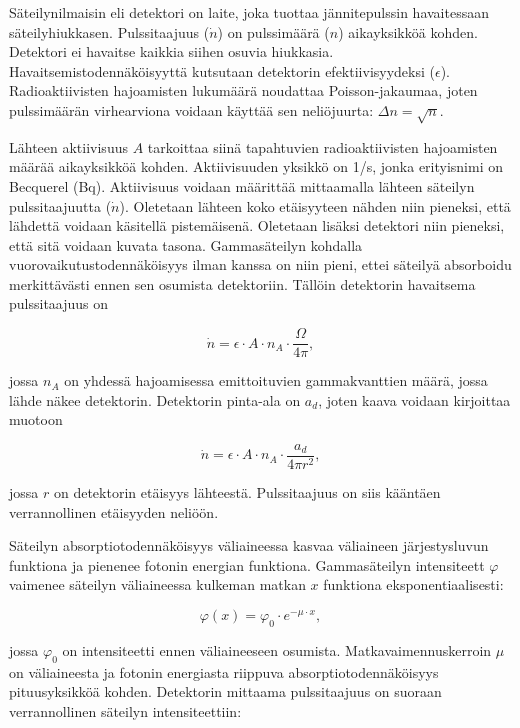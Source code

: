 \documentclass[a4paper,11pt]{article}
\begin{document}
Säteilynilmaisin eli detektori on laite, joka tuottaa jännitepulssin havaitessaan säteilyhiukkasen. Pulssitaajuus ($\dot{n}$) on pulssimäärä ($n$) aikayksikköä kohden. Detektori ei havaitse kaikkia siihen osuvia hiukkasia. Havaitsemistodennäköisyyttä kutsutaan detektorin efektiivisyydeksi ($\epsilon$). Radioaktiivisten hajoamisten lukumäärä noudattaa Poisson-jakaumaa, joten pulssimäärän virhearviona voidaan käyttää sen neliöjuurta: $\Delta n = \sqrt{n}$.

Lähteen aktiivisuus $A$ tarkoittaa siinä tapahtuvien radioaktiivisten hajoamisten määrää aikayksikköä kohden. Aktiivisuuden yksikkö on 1/s, jonka erityisnimi on Becquerel (Bq). Aktiivisuus voidaan määrittää mittaamalla lähteen säteilyn pulssitaajuutta ($\dot{n}$). Oletetaan lähteen koko etäisyyteen nähden niin pieneksi, että lähdettä voidaan käsitellä pistemäisenä. Oletetaan lisäksi detektori niin pieneksi, että sitä voidaan kuvata tasona. Gammasäteilyn kohdalla vuorovaikutustodennäköisyys ilman kanssa on niin pieni, ettei säteilyä absorboidu merkittävästi ennen sen osumista detektoriin. Tällöin detektorin havaitsema pulssitaajuus on 

\begin{equation}
  \dot{n} = \epsilon \cdot A \cdot n_A \cdot \frac{\Omega}{4 \pi} ,
\end{equation}

jossa $n_A$ on yhdessä hajoamisessa emittoituvien gammakvanttien määrä, jossa lähde näkee detektorin. Detektorin pinta-ala on $a_d$, joten kaava voidaan kirjoittaa muotoon

\begin{equation}
  \dot{n} = \epsilon \cdot A \cdot n_A \cdot \frac{a_d}{4 \pi r^2} ,
\end{equation}

jossa $r$ on detektorin etäisyys lähteestä. Pulssitaajuus on siis kääntäen verrannollinen etäisyyden neliöön. 

Säteilyn absorptiotodennäköisyys väliaineessa kasvaa väliaineen järjestysluvun funktiona ja pienenee fotonin energian funktiona. Gammasäteilyn intensiteett $\varphi$ vaimenee säteilyn väliaineessa kulkeman matkan $x$ funktiona eksponentiaalisesti:

\begin{equation}
  \varphi(x) = \varphi_0 \cdot e^{-\mu \cdot x} ,
\end{equation}

jossa $\varphi_0$ on intensiteetti ennen väliaineeseen osumista. Matkavaimennuskerroin $\mu$ on väliaineesta ja fotonin energiasta riippuva absorptiotodennäköisyys pituusyksikköä kohden. Detektorin mittaama pulssitaajuus on suoraan verrannollinen säteilyn intensiteettiin: 
\end{document}
